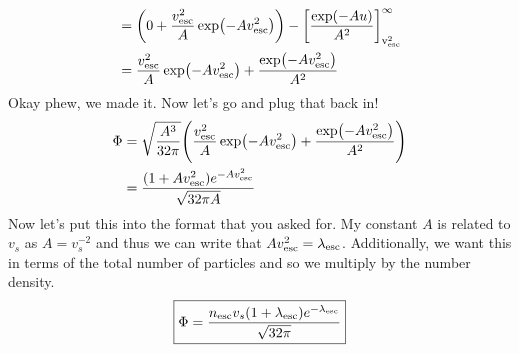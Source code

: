 \documentclass[12pt, letterpaper, twoside]{article}
\begin{document}
{\begin{align}
        &= \qty(0 + \frac{v_{\rm esc}^2}{A} \exp(- A v_{\rm esc}^2)) - \qty[\frac{\exp(- A u)}{A^2}]_{\rm v_{\rm esc}^2}^{\infty} \\
        &= \frac{v_{\rm esc}^2}{A} \exp(- A v_{\rm esc}^2) + \frac{\exp(- A v_{\rm esc}^2)}{A^2}
    \end{align}
    Okay phew, we made it. Now let's go and plug that back in!
    \begin{align}
        \Phi &= \sqrt{\frac{A^3}{32 \pi}} \qty( \frac{v_{\rm esc}^2}{A} \exp(- A v_{\rm esc}^2) + \frac{\exp(- A v_{\rm esc}^2)}{A^2} ) \\
             &= \frac{(1 + A v_{\rm esc}^2) e^{- A v_{\rm esc}^2}}{\sqrt{32 \pi A}}
    \end{align}
    Now let's put this into the format that you asked for. My constant $A$ is related to $v_s$ as $A = v_s^{-2}$ and thus we can write that $A v_{\rm esc}^2 = \lambda_{\rm esc}$. Additionally, we want this in terms of the total number of particles and so we multiply by the number density.
    \begin{equation}
        \boxed{ \Phi = \frac{n_{\rm esc} v_s (1 + \lambda_{\rm esc}) e^{- \lambda_{\rm esc}}}{\sqrt{32 \pi}} }
    \end{equation}
}
\end{document}
